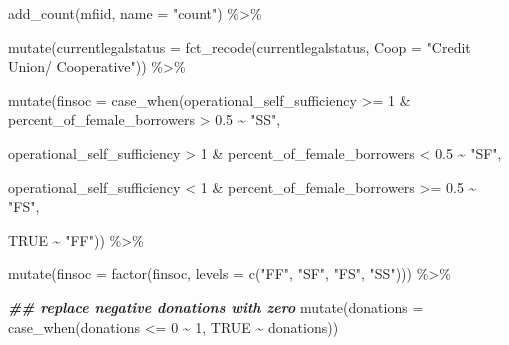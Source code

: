 \documentclass[a4paper,nobind]{templates/ociamthesis}
\newenvironment{Shaded}{\begin{snugshade}}{\end{snugshade}}
\newcommand{\AttributeTok}[1]{\textcolor[rgb]{0.77,0.63,0.00}{#1}}
\newcommand{\ConstantTok}[1]{\textcolor[rgb]{0.00,0.00,0.00}{#1}}
\newcommand{\DecValTok}[1]{\textcolor[rgb]{0.00,0.00,0.81}{#1}}
\newcommand{\DocumentationTok}[1]{\textcolor[rgb]{0.56,0.35,0.01}{\textbf{\textit{#1}}}}
\newcommand{\FloatTok}[1]{\textcolor[rgb]{0.00,0.00,0.81}{#1}}
\newcommand{\FunctionTok}[1]{\textcolor[rgb]{0.00,0.00,0.00}{#1}}
\newcommand{\NormalTok}[1]{#1}
\newcommand{\SpecialCharTok}[1]{\textcolor[rgb]{0.00,0.00,0.00}{#1}}
\newcommand{\StringTok}[1]{\textcolor[rgb]{0.31,0.60,0.02}{#1}}
\renewenvironment{Shaded}
{
  \vspace{10pt}%
  \begin{snugshade}%
}{%
  \end{snugshade}%
  \vspace{8pt}%
}
\begin{document}
\begin{Shaded}
\begin{Highlighting}[]
  \FunctionTok{add\_count}\NormalTok{(mfiid, }\AttributeTok{name =} \StringTok{"count"}\NormalTok{) }\SpecialCharTok{\%\textgreater{}\%} 
  
  \FunctionTok{mutate}\NormalTok{(}\AttributeTok{currentlegalstatus =} \FunctionTok{fct\_recode}\NormalTok{(currentlegalstatus, }\AttributeTok{Coop =} \StringTok{"Credit Union/ Cooperative"}\NormalTok{)) }\SpecialCharTok{\%\textgreater{}\%} 
  
  \FunctionTok{mutate}\NormalTok{(}\AttributeTok{finsoc =} \FunctionTok{case\_when}\NormalTok{(operational\_self\_sufficiency }\SpecialCharTok{\textgreater{}=} \DecValTok{1} \SpecialCharTok{\&}\NormalTok{ percent\_of\_female\_borrowers }\SpecialCharTok{\textgreater{}} \FloatTok{0.5} \SpecialCharTok{\textasciitilde{}} \StringTok{"SS"}\NormalTok{,}
                            
\NormalTok{                            operational\_self\_sufficiency }\SpecialCharTok{\textgreater{}} \DecValTok{1} \SpecialCharTok{\&}\NormalTok{ percent\_of\_female\_borrowers }\SpecialCharTok{\textless{}} \FloatTok{0.5} \SpecialCharTok{\textasciitilde{}} \StringTok{"SF"}\NormalTok{, }
                            
\NormalTok{                            operational\_self\_sufficiency }\SpecialCharTok{\textless{}} \DecValTok{1} \SpecialCharTok{\&}\NormalTok{ percent\_of\_female\_borrowers }\SpecialCharTok{\textgreater{}=} \FloatTok{0.5} \SpecialCharTok{\textasciitilde{}} \StringTok{"FS"}\NormalTok{,}
                            
                            \ConstantTok{TRUE} \SpecialCharTok{\textasciitilde{}} \StringTok{"FF"}\NormalTok{)) }\SpecialCharTok{\%\textgreater{}\%} 
  
\FunctionTok{mutate}\NormalTok{(}\AttributeTok{finsoc =} \FunctionTok{factor}\NormalTok{(finsoc, }\AttributeTok{levels =} \FunctionTok{c}\NormalTok{(}\StringTok{"FF"}\NormalTok{, }\StringTok{"SF"}\NormalTok{, }\StringTok{"FS"}\NormalTok{, }\StringTok{"SS"}\NormalTok{))) }\SpecialCharTok{\%\textgreater{}\%} 
  
\DocumentationTok{\#\# replace negative donations with zero}
\FunctionTok{mutate}\NormalTok{(}\AttributeTok{donations =} \FunctionTok{case\_when}\NormalTok{(donations }\SpecialCharTok{\textless{}=} \DecValTok{0} \SpecialCharTok{\textasciitilde{}} \DecValTok{1}\NormalTok{,}
                             \ConstantTok{TRUE} \SpecialCharTok{\textasciitilde{}}\NormalTok{ donations))}
\end{Highlighting}
\end{Shaded}
\end{document}
